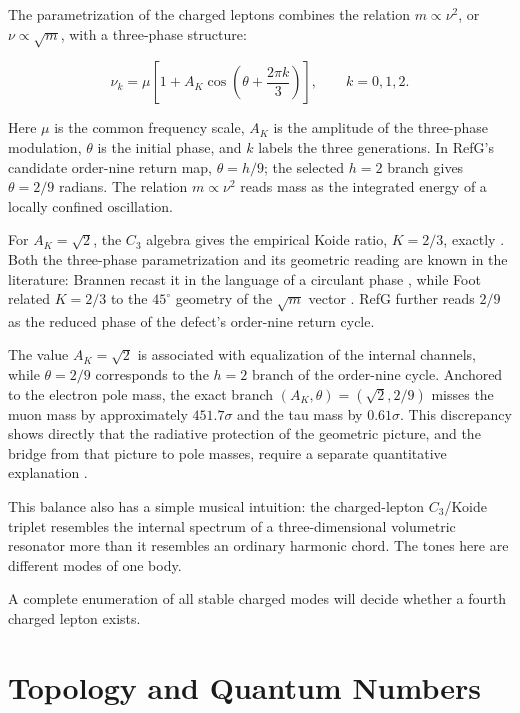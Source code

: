 \documentclass[11pt,a4paper]{article}
\begin{document}
The parametrization of the charged leptons combines the relation $m\propto\nu^2$, or $\nu\propto\sqrt{m}$, with a three-phase structure:

\begin{equation}
\nu_k=\mu\left[1+A_K\cos\left(\theta+\frac{2\pi k}{3}\right)\right],
\qquad k=0,1,2.
\label{eq:c3-triplet}
\end{equation}

Here $\mu$ is the common frequency scale, $A_K$ is the amplitude of the three-phase modulation, $\theta$ is the initial phase, and $k$ labels the three generations. In RefG's candidate order-nine return map, $\theta=h/9$; the selected $h=2$ branch gives $\theta=2/9$ radians. The relation $m\propto\nu^2$ reads mass as the integrated energy of a locally confined oscillation.

For $A_K=\sqrt{2}$, the $C_3$ algebra gives the empirical Koide ratio, $K=2/3$, exactly \citep{koide1982,koide1983}. Both the three-phase parametrization and its geometric reading are known in the literature: Brannen recast it in the language of a circulant phase \citep{brannen2006}, while Foot related $K=2/3$ to the $45^\circ$ geometry of the $\sqrt{m}$ vector \citep{foot1994}. RefG further reads $2/9$ as the reduced phase of the defect's order-nine return cycle.

The value $A_K=\sqrt{2}$ is associated with equalization of the internal channels, while $\theta=2/9$ corresponds to the $h=2$ branch of the order-nine cycle. Anchored to the electron pole mass, the exact branch $(A_K,\theta)=(\sqrt{2},2/9)$ misses the muon mass by approximately $451.7\sigma$ and the tau mass by $0.61\sigma$. This discrepancy shows directly that the radiative protection of the geometric picture, and the bridge from that picture to pole masses, require a separate quantitative explanation \citep{sumino2009}.

This balance also has a simple musical intuition: the charged-lepton $C_3$/Koide triplet resembles the internal spectrum of a three-dimensional volumetric resonator more than it resembles an ordinary harmonic chord. The tones here are different modes of one body.

A complete enumeration of all stable charged modes will decide whether a fourth charged lepton exists.

\section{Topology and Quantum Numbers}
\end{document}

